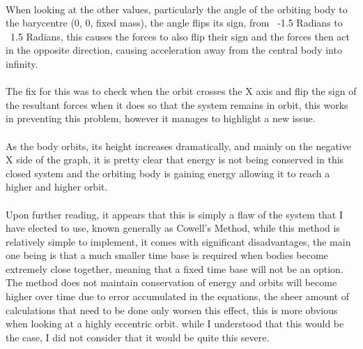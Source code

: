 \paragraph{}
When looking at the other values, particularly the angle of the orbiting body to the barycentre (0, 0, fixed mass), the angle flips its sign, from ~-1.5 Radians to ~1.5 Radians, this causes the forces to also flip their sign and the forces then act in the opposite direction, causing acceleration away from the central body into infinity.

\paragraph{}
The fix for this was to check when the orbit crosses the X axis and flip the sign of the resultant forces when it does so that the system remains in orbit, this works in preventing this problem, however it manages to highlight a new issue.

\paragraph{}
As the body orbits, its height increases dramatically, and mainly on the negative X side of the graph, it is pretty clear that energy is not being conserved in this closed system and the orbiting body is gaining energy allowing it to reach a higher and higher orbit.

\paragraph{}
Upon further reading, it appears that this is simply a flaw of the system that I have elected to use, known generally as Cowell’s Method, while this method is relatively simple to implement, it comes with significant disadvantages, the main one being is that a much smaller time base is required when bodies become extremely close together, meaning that a fixed time base will not be an option. The method does not maintain conservation of energy and orbits will become higher over time due to error accumulated in the equations, the sheer amount of calculations that need to be done only worsen this effect, this is more obvious when looking at a highly eccentric orbit. while I understood that this would be the case, I did not consider that it would be quite this severe.

